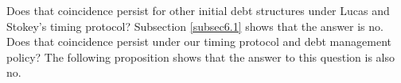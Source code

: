 \documentclass[12pt]{article}
\newcommand{\NW}[1]{{\textcolor{blue}{#1}}}
\newcommand{\WJ}[1]{{\textcolor{red}{#1}}}
\begin{document}
	

{Does  that   coincidence persist  for  other initial debt structures under Lucas and Stokey's timing protocol?  Subsection \ref{subsec6.1} shows that the answer is no. Does that   coincidence persist  under  our timing protocol and debt management policy?
 The following proposition shows that the answer to this question is also no.} 








%
% 
 
%
%
\end{document}
